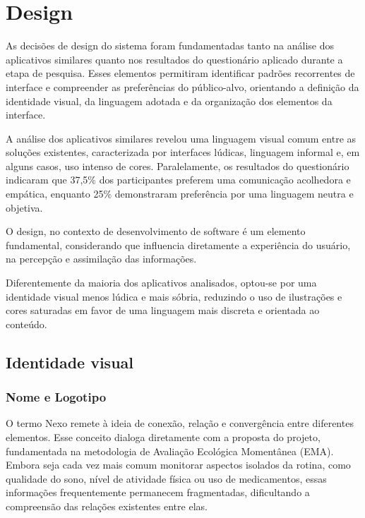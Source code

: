 \chapter{Design}


As decisões de design do sistema foram fundamentadas tanto na análise dos
aplicativos similares quanto nos resultados do questionário aplicado durante a
etapa de pesquisa. Esses elementos permitiram identificar padrões recorrentes
de interface e compreender as preferências do público-alvo, orientando a
definição da identidade visual, da linguagem adotada e da organização dos
elementos da interface.

A análise dos aplicativos similares revelou uma linguagem visual comum entre as
soluções existentes, caracterizada por interfaces lúdicas, linguagem informal
e, em alguns casos, uso intenso de cores. Paralelamente, os resultados do
questionário indicaram que 37,5\% dos participantes preferem uma comunicação
acolhedora e empática, enquanto 25\% demonstraram preferência por uma linguagem
neutra e objetiva.

O design, no contexto de desenvolvimento de software é um elemento fundamental,
considerando que influencia diretamente a experiência do usuário, na percepção
e assimilação das informações.

Diferentemente da maioria dos aplicativos analisados, optou-se por uma
identidade visual menos lúdica e mais sóbria, reduzindo o uso de ilustrações e
cores saturadas em favor de uma linguagem mais discreta e orientada ao
conteúdo.

\section{Identidade visual}

\lipsum[1-2]

\subsection{Nome e Logotipo}

O termo Nexo remete à ideia de conexão, relação e convergência entre
diferentes elementos. Esse conceito dialoga diretamente com a proposta do
projeto, fundamentada na metodologia de Avaliação Ecológica Momentânea (EMA).
Embora seja cada vez mais comum monitorar aspectos isolados da rotina, como
qualidade do sono, nível de atividade física ou uso de medicamentos, essas
informações frequentemente permanecem fragmentadas, dificultando a compreensão
das relações existentes entre elas.

